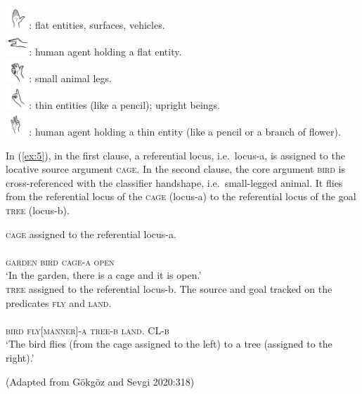 \documentclass[review]{elsarticle} %
\begin{document}
\begin{exe}
\ex \label{ex:4}
\includegraphics[width=25pt]{pictures/flathand.png}: flat entities, surfaces, vehicles.\\
\includegraphics[width=25pt]{pictures/flat.png}: human agent holding a flat entity.\\
\includegraphics[width=25pt]{pictures/small_legged.png}: small animal legs.\\
\includegraphics[width=25pt]{pictures/index.png}: thin entities (like a pencil); upright beings.\\
\includegraphics[width=25pt]{pictures/hold.png}: human agent holding a thin entity (like a pencil or a branch of flower). 
\end{exe}

In (\ref{ex:5}), in the first clause, a referential locus, i.e.~locus-a,
is assigned to the locative source argument \textsc{cage}. In the second
clause, the core argument \textsc{bird} is cross-referenced with the
classifier handshape, i.e.~small-legged animal. It flies from the
referential locus of the \textsc{cage} (locus-a) to the referential
locus of the goal \textsc{tree} (locus-b).

\begin{exe}
    \ex \label{ex:5}
\begin{xlist}
    \ex \textsc{cage} assigned to the referential locus-a. \\ \\
    \textsc{garden bird cage-a open} \\
    ‘In the garden, there is a cage and it is open.’
    \\
    
    \ex \textsc{tree} assigned to the referential locus-b. The source and goal tracked on the predicates \textsc{fly} and \textsc{land}. \\ \\
    \textsc{bird fly[manner]-a tree-b land. CL-b}\\
    ‘The bird flies (from the cage assigned to the left) to a tree (assigned to the right).’
    \end{xlist}
    \end{exe}
    \hfill (Adapted from Gökgöz and Sevgi 2020:318)
\end{document}
